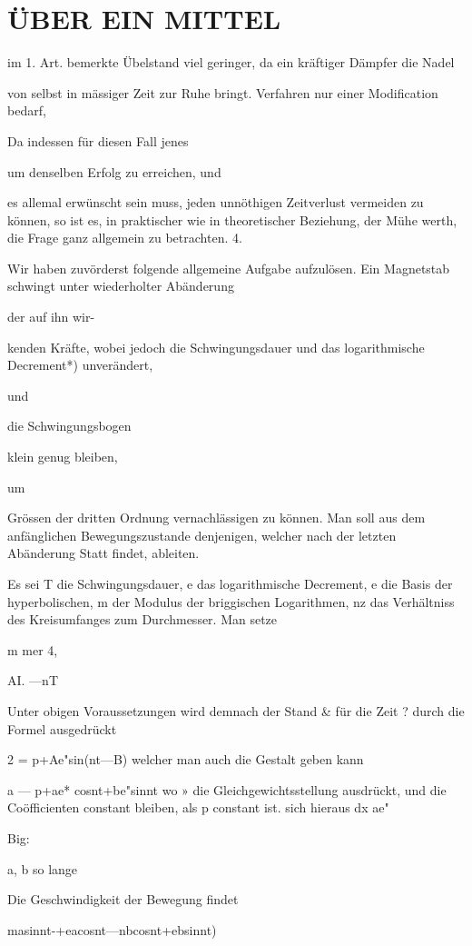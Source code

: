 \documentclass[12pt,a4paper]{article}
\begin{document}
\section*{ÜBER EIN MITTEL}
im 1. Art. bemerkte Übelstand viel geringer, da ein kräftiger Dämpfer die Nadel

von selbst in mässiger Zeit zur Ruhe bringt. Verfahren nur einer Modification bedarf,

Da indessen für diesen Fall jenes

um denselben Erfolg zu erreichen, und

es allemal erwünscht sein muss, jeden unnöthigen Zeitverlust vermeiden zu können, so ist es, in praktischer wie in theoretischer Beziehung, der Mühe werth, die Frage ganz allgemein zu betrachten. 4.

Wir haben zuvörderst folgende allgemeine Aufgabe aufzulösen. Ein Magnetstab schwingt unter wiederholter Abänderung

der auf ihn wir-

kenden Kräfte, wobei jedoch die Schwingungsdauer und das logarithmische Decrement*) unverändert,

und

die Schwingungsbogen

klein genug bleiben,

um

Grössen der dritten Ordnung vernachlässigen zu können. Man soll aus dem anfänglichen Bewegungszustande denjenigen, welcher nach der letzten Abänderung Statt findet, ableiten.

Es sei T die Schwingungsdauer, e das logarithmische Decrement, e die Basis der hyperbolischen, m der Modulus der briggischen Logarithmen, nz das Verhältniss des Kreisumfanges zum Durchmesser. Man setze

m mer 4,

AI. —nT

Unter obigen Voraussetzungen wird demnach der Stand \& für die Zeit ? durch die Formel ausgedrückt

2 = p+Ae"sin(nt—B) welcher man auch die Gestalt geben kann

a — p+ae* cosnt+be"sinnt wo » die Gleichgewichtsstellung ausdrückt, und die Coöfficienten constant bleiben, als p constant ist. sich hieraus dx ae"

Big:

a, b so lange

Die Geschwindigkeit der Bewegung findet

masinnt-+eacosnt—nbcosnt+ebsinnt)
\end{document}
